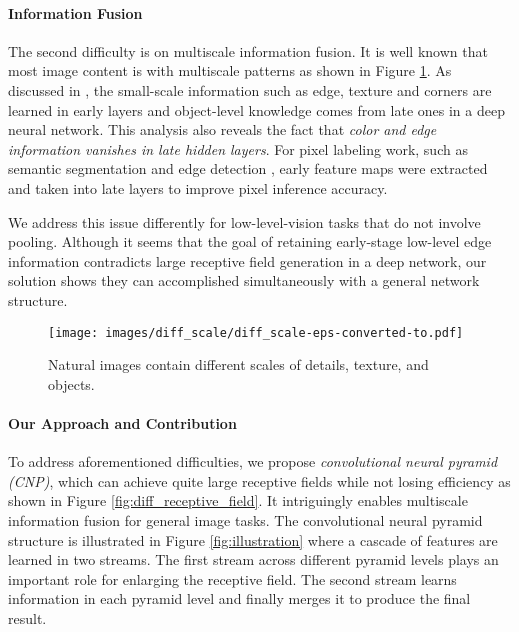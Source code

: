 \documentclass[10pt,twocolumn,letterpaper]{article}
\begin{document}
\vspace{-0.1in}\paragraph{Information Fusion} The second difficulty is on multiscale
information fusion. It is well known that most image content is with multiscale patterns
as shown in Figure \ref{fig:diff_scale}. As discussed in \cite{ZeilerF14}, the
small-scale information such as edge, texture and corners are learned in early layers and
object-level knowledge comes from late ones in a deep neural network. This analysis also
reveals the fact that {\it color and edge information vanishes in late hidden layers}.
For pixel labeling work, such as semantic segmentation \cite{LongSD15} and edge detection
\cite{LiuP016}, early feature maps were extracted and taken into late layers to improve
pixel inference accuracy.

We address this issue differently for low-level-vision tasks that do not involve pooling.
Although it seems that the goal of retaining early-stage low-level edge information
contradicts large receptive field generation in a deep network, our solution shows they
can accomplished simultaneously with a general network structure.

\begin{figure}[t]
\centering
\texttt{[image: images/diff\_scale/diff\_scale-eps-converted-to.pdf]}
\caption{Natural images contain different scales of details, texture, and objects.
\vspace{-0.1in}} \label{fig:diff_scale}
\end{figure}

\vspace{-0.1in}\paragraph{Our Approach and Contribution} To address aforementioned
difficulties, we propose {\it convolutional neural pyramid (CNP)}, which can achieve
quite large receptive fields while not losing efficiency as shown in Figure
\ref{fig:diff_receptive_field}. It intriguingly enables multiscale information fusion for
general image tasks. The convolutional neural pyramid structure is illustrated in Figure
\ref{fig:illustration} where a cascade of features are learned in two streams. The first
stream across different pyramid levels plays an important role for enlarging the
receptive field. The second stream learns information in each pyramid level and finally
merges it to produce the final result.
\end{document}
